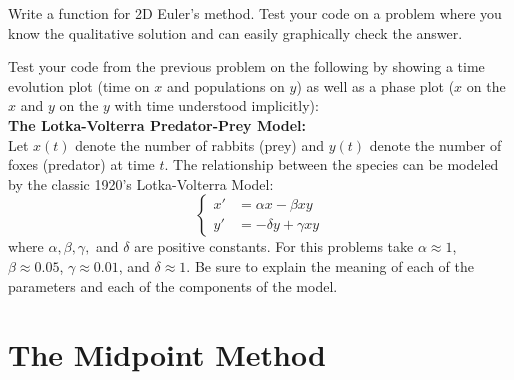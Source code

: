 \begin{problem}
    Write a \ProgLang function for 2D Euler's method.  Test your code on a problem where you
    know the qualitative solution and can easily graphically check the answer.
\end{problem}


\begin{problem}\label{prob:2dPredPrey}
    Test your code from the previous problem on the
    following by showing a time evolution plot (time on $x$ and populations on
    $y$) as well as a phase plot ($x$ on the $x$ and $y$ on the $y$ with time understood
    implicitly):\\
    {\bf The Lotka-Volterra Predator-Prey Model:}\\
    Let $x(t)$ denote the number of rabbits (prey) and $y(t)$ denote the number of foxes
    (predator) at time $t$.  The relationship between the species can be modeled by the
    classic 1920's Lotka-Volterra Model:
    \[ \left\{ \begin{array}{ll} x' &= \alpha x - \beta xy \\ y' &= -\delta y + \gamma xy
        \end{array} \right. \]
    where $\alpha, \beta, \gamma,$ and $\delta$ are positive constants.  For this
    problems take $\alpha \approx 1$, $\beta \approx 0.05$, $\gamma \approx 0.01$, and
    $\delta \approx 1$.  Be sure to explain the meaning of each of the parameters and each
    of the components of the model.
\end{problem}



\newpage\section{The Midpoint Method}

